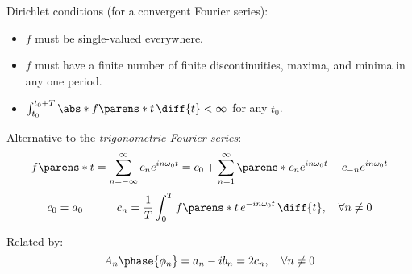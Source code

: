 \begin{multicols}{2}
\begin{CheatsheetEntryFrame}
        Dirichlet conditions (for a convergent Fourier series):
        \begin{itemize}
            \item $f$ must be single-valued everywhere.
            \item $f$ must have a finite number of finite discontinuities, maxima, and minima in any one period.
            \item $\int_{t_0}^{t_0+T} \abs*{f\parens*{t}} \,\diff{t} < \infty$ for any $t_0$.
        \end{itemize}

    \end{CheatsheetEntryFrame}

    \begin{CheatsheetEntryFrame}


        Alternative to the \emph{trigonometric Fourier series}:
        \begin{equation*}
            f\parens*{t}
            = \sum_{n = -\infty}^\infty c_n e^{i n \omega_0 t}
            = c_0 + \sum_{n = 1}^\infty \parens*{
                c_n e^{i n \omega_0 t} + c_{-n} e^{i n \omega_0 t}
            }
        \end{equation*}
        \begin{equation*}
            c_0 = a_0
            \qquad\quad
            c_n = \frac{1}{T} \int_0^T f\parens*{t} \, e^{-i n \omega_0 t} \,\diff{t}
            , \quad \forall n \ne 0
        \end{equation*}

        Related by:
        \begin{equation*}
            A_n \phase{\phi_n} = a_n - i b_n = 2 c_n, \quad \forall n \ne 0
        \end{equation*}

    \end{CheatsheetEntryFrame}

    \begin{CheatsheetEntryFrame}


\end{CheatsheetEntryFrame}
\end{multicols}
